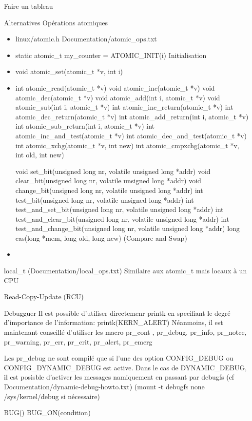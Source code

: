 Faire un tableau
\begin{frame}{Alternatives}
  Opérations atomiques
  \begin{itemize}
  \item linux/atomic.h Documentation/atomic_ops.txt
  \item static atomic_t my_counter = ATOMIC_INIT(i) Initialisation
  \item void atomic_set(atomic_t *v, int i)
  \item int atomic_read(atomic_t *v)
        void atomic_inc(atomic_t *v)
        void atomic_dec(atomic_t *v)
        void atomic_add(int i, atomic_t *v)
        void atomic_sub(int i, atomic_t *v)
        int atomic_inc_return(atomic_t *v)
        int atomic_dec_return(atomic_t *v)
        int atomic_add_return(int i, atomic_t *v)
        int atomic_sub_return(int i, atomic_t *v)
        int atomic_inc_and_test(atomic_t *v)
        int atomic_dec_and_test(atomic_t *v)
        int atomic_xchg(atomic_t *v, int new)
        int atomic_cmpxchg(atomic_t *v, int old, int new)


        void set_bit(unsigned long nr, volatile unsigned long *addr)
        void clear_bit(unsigned long nr, volatile unsigned long *addr)
        void change_bit(unsigned long nr, volatile unsigned long *addr)
        int test_bit(unsigned long nr, volatile unsigned long *addr)
        int test_and_set_bit(unsigned long nr, volatile unsigned long *addr)
        int test_and_clear_bit(unsigned long nr, volatile unsigned long *addr)
        int test_and_change_bit(unsigned long nr, volatile unsigned long *addr)
        long cas(long *mem, long old, long new) (Compare and Swap)

  \item 
  \end{itemize} 
local_t (Documentation/local_ops.txt) Similaire aux atomic_t mais locaux à un CPU

 Read-Copy-Update (RCU)
\end{frame} 


\begin{frame}{ Debugguer}
Il est possible d'utiliser directemenr printk en specifiant le degré d'importance de l'information:
printk(KERN_ALERT)
Néanmoins, il est maintenant conseillé d'utiliser les macro pr_cont , pr_debug, pr_info, pr_notce, pr_warning, pr_err, pr_crit, pr_alert, pr_emerg

Les pr_debug ne sont compilé que si l'une des option CONFIG_DEBUG ou CONFIG_DYNAMIC_DEBUG est active. Dans le cas de DYNAMIC_DEBUG, il est posisble d'activer les messages namiquement en passant par debugfs (cf Documentation/dynamic-debug-howto.txt)
(mount -t debugfs none /sys/kernel/debug si nécessaire)

BUG()
BUG_ON(condition)
\end{frame} 
